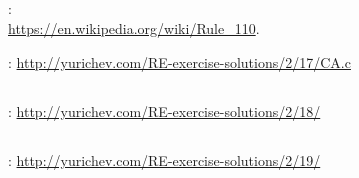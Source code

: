\subsection{}

:\\
\url{https://en.wikipedia.org/wiki/Rule_110}.

\Sourcecode: \url{http://yurichev.com/RE-exercise-solutions/2/17/CA.c}

\subsection{}

\Sourcecode: \url{http://yurichev.com/RE-exercise-solutions/2/18/}

\subsection{}

\Sourcecode: \url{http://yurichev.com/RE-exercise-solutions/2/19/}


